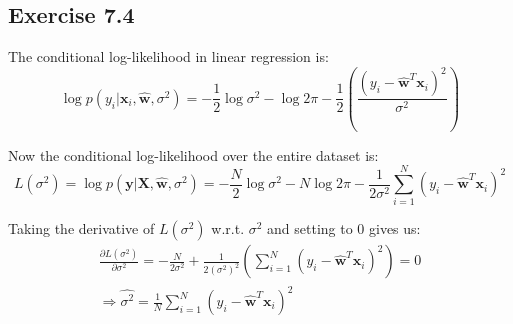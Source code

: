 \documentclass{article}
\newcommand{\vct}[1]{\mathbf{#1}}
\begin{document}
\subsection*{Exercise 7.4}
\begin{flushleft}
The conditional log-likelihood in linear regression is:
\begin{equation}
\log p(y_{i} | \vct{x}_{i}, \hat{\vct{w}}, \sigma^{2}) = -\frac{1}{2}\log \sigma^{2} - \log 2\pi - \frac{1}{2}\left(\frac{(y_{i} - \hat{\vct{w}}^{T}\vct{x}_{i})^{2}}{\sigma^{2}}\right)
\end{equation}

Now the conditional log-likelihood over the entire dataset is:
\begin{equation}
L(\sigma^{2}) = \log p(\vct{y} | \vct{X}, \hat{\vct{w}}, \sigma^{2}) = -\frac{N}{2}\log\sigma^{2} - N\log 2\pi - \frac{1}{2\sigma^{2}}\sum_{i=1}^{N}(y_{i} - \hat{\vct{w}}^{T}\vct{x}_{i})^{2}
\end{equation}

Taking the derivative of \(L(\sigma^{2})\) w.r.t. \(\sigma^{2}\) and setting to 0 gives us:
\begin{gather}
\frac{\partial L(\sigma^{2})}{\partial \sigma^{2}} = -\frac{N}{2\sigma^{2}} + \frac{1}{2(\sigma^{2})^{2}}\left(\sum_{i=1}^{N}(y_{i} - \hat{\vct{w}}^{T}\vct{x}_{i})^{2}\right) = 0\\
\Rightarrow \hat{\sigma^{2}} = \frac{1}{N}\sum_{i=1}^{N}(y_{i} - \hat{\vct{w}}^{T}\vct{x}_{i})^{2}
\end{gather}
\end{flushleft}
\end{document}
